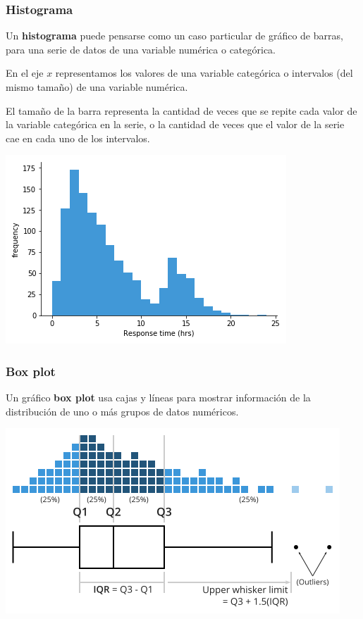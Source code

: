 \documentclass[aspectratio=169,12pt]{beamer}
\begin{document}
\begin{frame}
\frametitle{Histograma}

\begin{minipage}{.55\textwidth}
Un \textbf{histograma} puede pensarse como un caso particular de gráfico de barras, para una serie de datos de una variable numérica o categórica.

En el eje $x$ representamos los valores de una variable categórica o intervalos (del mismo tamaño) de una variable numérica.

El tamaño de la barra representa la cantidad de veces que se repite cada valor de la variable categórica en la serie, o la cantidad de veces que el valor de la serie cae en cada uno de los intervalos.
\end{minipage} \hspace{1cm} %
\begin{minipage}{.35\textwidth}
\begin{center}
\includegraphics[scale=1.5]{clase4-histogram-example-1.png}
\end{center}
\end{minipage}
\end{frame}



\begin{frame}
\frametitle{Box plot}

Un gráfico \textbf{box plot} usa cajas y líneas para mostrar información de la distribución de uno o más grupos de datos numéricos.

\begin{center}
\includegraphics[scale=.5]{clase4-box-plot-construction.png}
\end{center}

\end{frame}
\end{document}
